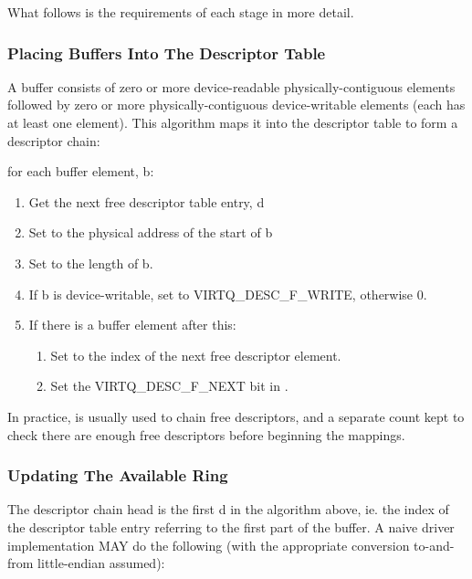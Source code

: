 What follows is the requirements of each stage in more detail.

\subsubsection{Placing Buffers Into The Descriptor Table}\label{sec:General Initialization And Device Operation / Device Operation / Supplying Buffers to The Device / Placing Buffers Into The Descriptor Table}

A buffer consists of zero or more device-readable physically-contiguous
elements followed by zero or more physically-contiguous
device-writable elements (each has at least one element). This
algorithm maps it into the descriptor table to form a descriptor
chain:

for each buffer element, b:

\begin{enumerate}
\item Get the next free descriptor table entry, d
\item Set  to the physical address of the start of b
\item Set  to the length of b.
\item If b is device-writable, set  to VIRTQ_DESC_F_WRITE,
    otherwise 0.
\item If there is a buffer element after this:
    \begin{enumerate}
    \item Set  to the index of the next free descriptor
      element.
    \item Set the VIRTQ_DESC_F_NEXT bit in .
    \end{enumerate}
\end{enumerate}

In practice,  is usually used to chain free
descriptors, and a separate count kept to check there are enough
free descriptors before beginning the mappings.

\subsubsection{Updating The Available Ring}\label{sec:General Initialization And Device Operation / Device Operation / Supplying Buffers to The Device / Updating The Available Ring}

The descriptor chain head is the first d in the algorithm
above, ie. the index of the descriptor table entry referring to the first
part of the buffer.  A naive driver implementation MAY do the following (with the
appropriate conversion to-and-from little-endian assumed):

